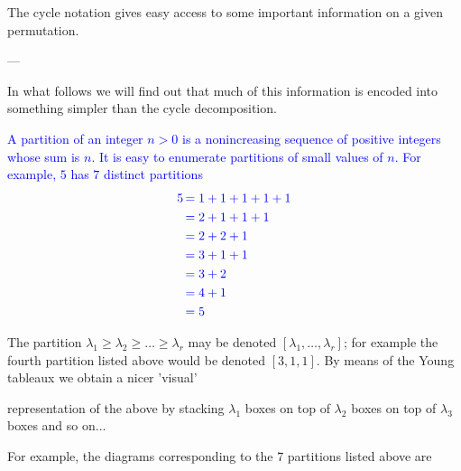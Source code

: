 The cycle notation gives easy access to some important information on a given permutation.

---

In what follows we will find out that much of this information is encoded into something simpler than the cycle decomposition.

\textcolor{blue}{A partition of an integer $n > 0$ is a nonincreasing sequence of positive integers whose sum is $n$. It is easy to enumerate partitions of small values of $n$. For example, $5$ has $7$ distinct partitions}
\begin{align*}
\textcolor{blue}{5} &\textcolor{blue}{\,= 1 + 1 + 1 + 1 + 1} \\
&\textcolor{blue}{\,= 2 + 1 + 1 + 1} \\
&\textcolor{blue}{\,= 2 + 2 + 1} \\
&\textcolor{blue}{\,= 3 + 1 + 1} \\
&\textcolor{blue}{\,= 3 + 2} \\
&\textcolor{blue}{\,= 4 + 1} \\
&\textcolor{blue}{\,= 5}
\end{align*}

The partition $\lambda_1 \geq \lambda_2 \geq \dots \geq \lambda_r$ may be denoted $[\lambda_1, \dots, \lambda_r]$; for example the fourth partition listed above would be denoted $[3, 1, 1]$. By means of the Young tableaux we obtain a nicer 'visual'

representation of the above by stacking $\lambda_1$ boxes on top of $\lambda_2$ boxes on top of $\lambda_3$ boxes and so on...

For example, the diagrams corresponding to the 7 partitions listed above are

